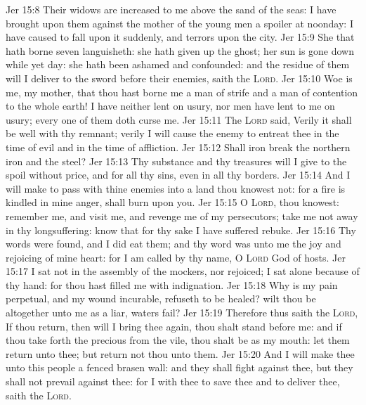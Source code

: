 \vs Jer 15:8 Their widows are increased to me above the sand of the seas: I have brought upon them against the mother of the young men a spoiler at noonday: I have caused  to fall upon it suddenly, and terrors upon the city.
\vs Jer 15:9 She that hath borne seven languisheth: she hath given up the ghost; her sun is gone down while  yet day: she hath been ashamed and confounded: and the residue of them will I deliver to the sword before their enemies, saith the \textsc{Lord}.
\vs Jer 15:10 Woe is me, my mother, that thou hast borne me a man of strife and a man of contention to the whole earth! I have neither lent on usury, nor men have lent to me on usury;  every one of them doth curse me.
\vs Jer 15:11 The \textsc{Lord} said, Verily it shall be well with thy remnant; verily I will cause the enemy to entreat thee  in the time of evil and in the time of affliction.
\vs Jer 15:12 Shall iron break the northern iron and the steel?
\vs Jer 15:13 Thy substance and thy treasures will I give to the spoil without price, and  for all thy sins, even in all thy borders.
\vs Jer 15:14 And I will make  to pass with thine enemies into a land  thou knowest not: for a fire is kindled in mine anger,  shall burn upon you.
\vs Jer 15:15 O \textsc{Lord}, thou knowest: remember me, and visit me, and revenge me of my persecutors; take me not away in thy longsuffering: know that for thy sake I have suffered rebuke.
\vs Jer 15:16 Thy words were found, and I did eat them; and thy word was unto me the joy and rejoicing of mine heart: for I am called by thy name, O \textsc{Lord} God of hosts.
\vs Jer 15:17 I sat not in the assembly of the mockers, nor rejoiced; I sat alone because of thy hand: for thou hast filled me with indignation.
\vs Jer 15:18 Why is my pain perpetual, and my wound incurable,  refuseth to be healed? wilt thou be altogether unto me as a liar,  waters  fail?
\vs Jer 15:19 Therefore thus saith the \textsc{Lord}, If thou return, then will I bring thee again,  thou shalt stand before me: and if thou take forth the precious from the vile, thou shalt be as my mouth: let them return unto thee; but return not thou unto them.
\vs Jer 15:20 And I will make thee unto this people a fenced brasen wall: and they shall fight against thee, but they shall not prevail against thee: for I  with thee to save thee and to deliver thee, saith the \textsc{Lord}.
